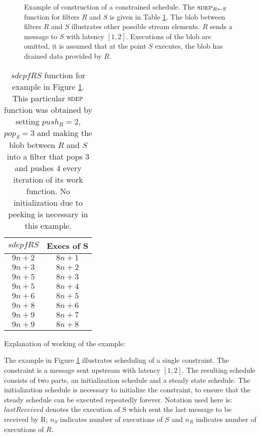 \begin{figure}[t]
\begin{center}
\caption{{\small Example of construction of a constrained schedule. The $\sdepf{R}{S}$ function for filters $R$ and $S$ is given in Table \ref{tab:sdepconst}. The blob between filters $R$ and $S$ illustrates other possible stream elements. $R$ sends a message to $S$ with latency $[1,2]$. Executions of the blob are omitted, it is assumed that at the point $S$ executes, the blob has drained data provided by $R$.}}
\end{center}
\vspace{-12pt}
\label{fig:sdepconst}
\end{figure}

\begin{table*}[t]
{\small
\begin{tabular}{|c|c|} \hline
{\bf $sdepf{R}{S}$} & {\bf Execs of S} \\ \hline
$9n+2$ & $8n+1$ \\ \hline
$9n+3$ & $8n+2$ \\ \hline
$9n+5$ & $8n+3$ \\ \hline
$9n+5$ & $8n+4$ \\ \hline
$9n+6$ & $8n+5$ \\ \hline
$9n+8$ & $8n+6$ \\ \hline
$9n+9$ & $8n+7$ \\ \hline
$9n+9$ & $8n+8$ \\ \hline
\end{tabular}}
\caption{\small $sdepf{R}{S}$ function for example in Figure \ref{fig:sdepconst}. This particular $\textsc{sdep}$ function was obtained by setting $push_R=2$, $pop_S=3$ and making the blob between $R$ and $S$ into a filter that pops 3 and pushes 4 every iteration of its work function. No initialization due to peeking is necessary in this example.}
\label{tab:sdepconst}
\end{table*}


Explanation of working of the example:

The example in Figure \ref{fig:sdepconst} illustrates scheduling of a single constraint. The constraint is a message sent upstream with latency $[1,2]$. The resulting schedule consists of two parts, an initialization schedule and a steady state schedule. The initialization schedule is necessary to initialize the constraint, to ensure that the steady schedule can be executed repeatedly forever. Notation used here is: $lastReceived$ denotes the execution of S which sent the last message to be received by R; $n_S$ indicates number of executions of $S$ and $n_R$ indicates number of executions of $R$.

